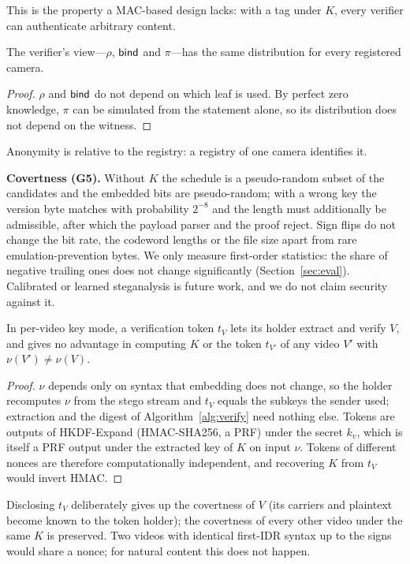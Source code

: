 This is the property a MAC-based design lacks: with a tag under $K$, every verifier can authenticate arbitrary content.

\begin{proposition}[Anonymity, G4]
The verifier's view---$\rho$, $\mathsf{bind}$ and $\pi$---has the same distribution for every registered camera.
\end{proposition}
\begin{proof}
$\rho$ and $\mathsf{bind}$ do not depend on which leaf is used. By perfect zero knowledge, $\pi$ can be simulated from the statement alone, so its distribution does not depend on the witness.
\end{proof}
Anonymity is relative to the registry: a registry of one camera identifies it.

\textbf{Covertness (G5).} Without $K$ the schedule is a pseudo-random subset of the candidates and the embedded bits are pseudo-random; with a wrong key the version byte matches with probability $2^{-8}$ and the length must additionally be admissible, after which the payload parser and the proof reject. Sign flips do not change the bit rate, the codeword lengths or the file size apart from rare emulation-prevention bytes. We only measure first-order statistics: the share of negative trailing ones does not change significantly (Section~\ref{sec:eval}). Calibrated or learned steganalysis is future work, and we do not claim security against it.

\begin{proposition}
\label{prop:token}
In per-video key mode, a verification token $t_V$ lets its holder extract and verify $V$, and gives no advantage in computing $K$ or the token $t_{V'}$ of any video $V'$ with $\nu(V')\ne\nu(V)$.
\end{proposition}
\begin{proof}
$\nu$ depends only on syntax that embedding does not change, so the holder recomputes $\nu$ from the stego stream and $t_V$ equals the subkeys the sender used; extraction and the digest of Algorithm~\ref{alg:verify} need nothing else. Tokens are outputs of HKDF-Expand (HMAC-SHA256, a PRF) under the secret $k_v$, which is itself a PRF output under the extracted key of $K$ on input $\nu$. Tokens of different nonces are therefore computationally independent, and recovering $K$ from $t_V$ would invert HMAC.
\end{proof}
Disclosing $t_V$ deliberately gives up the covertness of $V$ (its carriers and plaintext become known to the token holder); the covertness of every other video under the same $K$ is preserved. Two videos with identical first-IDR syntax up to the signs would share a nonce; for natural content this does not happen.

